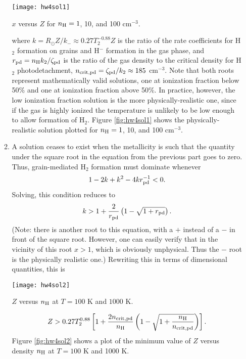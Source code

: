 \begin{enumerate}
\begin{enumerate}
\begin{marginfigure}
\texttt{[image: hw4sol1]}
\caption[Solution to problem set~\thesolutionset, problem~\theenumi\theenumii]{
\label{fig:hw4sol1}
$x$ versus $Z$ for $n_{\rm H} = 1$, 10, and 100 cm$^{-3}$.
}
\end{marginfigure}
where $k = R_{\odot} Z/k_{-}\approx 0.27 T_2^{-0.88} Z$ is the ratio of the rate coefficients for H$_2$ formation on grains and H$^-$ formation in the gas phase, and $r_{\rm pd} = n_{\rm H} k_2 / \zeta_{\rm pd}$ is the ratio of the gas density to the critical density for H$_2$ photodetachment, $n_{\rm crit,pd} = \zeta_{\rm pd}/k_2\approx 185$ cm$^{-3}$. Note that both roots represent mathematically valid solutions, one at ionization fraction below 50\% and one at ionization fraction above 50\%. In practice, however, the low ionization fraction solution is the more physically-realistic one, since if the gas is highly ionized the temperature is unlikely to be low enough to allow formation of H$_2$. Figure \ref{fig:hw4sol1} shows the physically-realistic solution plotted for $n_{\rm H} = 1$, 10, and 100 cm$^{-3}$.

\item A solution ceases to exist when the metallicity is such that the quantity under the square root in the equation from the previous part goes to zero. Thus, grain-mediated H$_2$ formation must dominate whenever
\begin{displaymath}
1 - 2k + k^2 - 4 k r_{\rm pd}^{-1} < 0.
\end{displaymath}
Solving, this condition reduces to
\begin{displaymath}
k > 1 + \frac{2}{r_{\rm pd}} \left(1 - \sqrt{1+r_{\rm pd}}\right).
\end{displaymath}
(Note: there is another root to this equation, with a $+$ instead of a $-$ in front of the square root. However, one can easily verify that in the vicinity of this root $x>1$, which is obviously unphysical. Thus the $-$ root is the physically realistic one.) Rewriting this in terms of dimensional quantities, this is
\begin{marginfigure}
\texttt{[image: hw4sol2]}
\caption[Solution to problem set~\thesolutionset, problem~\theenumi\theenumii]{
\label{fig:hw4sol2}
$Z$ versus $n_{\rm H}$ at $T=100$ K and $1000$ K.
}
\end{marginfigure}
\begin{displaymath}
Z > 0.27 T_2^{0.88} \left[1 + \frac{2 n_{\rm crit,pd}}{n_{\rm H}} \left(1 - \sqrt{1+\frac{n_{\rm H}}{n_{\rm crit,pd}}}\right)\right].
\end{displaymath}
Figure \ref{fig:hw4sol2} shows a plot of the minimum value of $Z$ versus density $n_{\rm H}$ at $T=100$ K and 1000 K.



\end{enumerate}
\end{enumerate}
